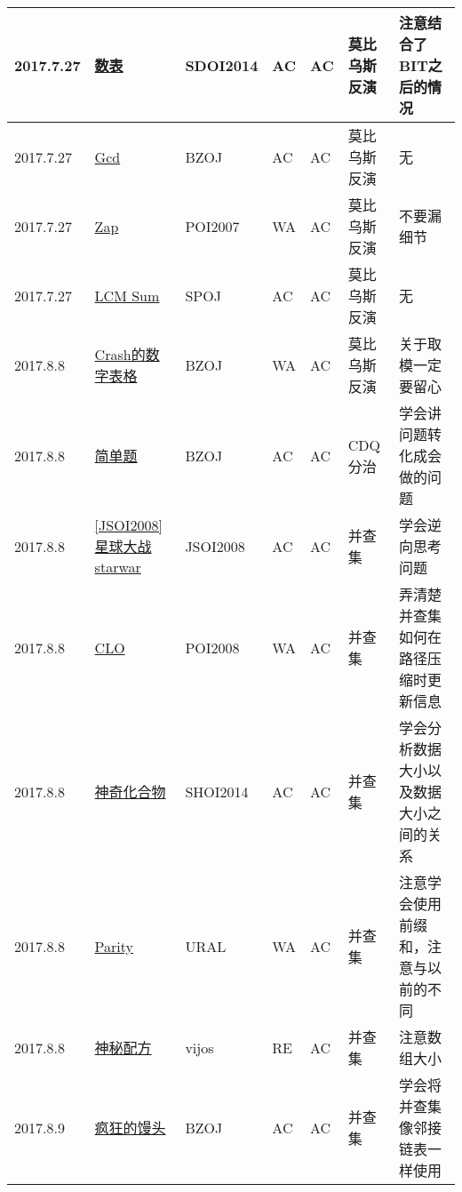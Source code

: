 \documentclass[a4paper]{article}
\begin{document}
\begin{longtable}{|p{1.5cm}|p{2.5cm}|p{1.6cm}|p{1.6cm}|p{1cm}|p{3cm}|p{4cm}|}
		\hline
		2017.7.27 & \href {http://www.lydsy.com/JudgeOnline/problem.php?id=3529}{数表}
		 & SDOI2014 & AC & AC & 莫比乌斯反演 & 注意结合了BIT之后的情况\\
		
		\hline
		2017.7.27 & \href {http://www.lydsy.com/JudgeOnline/problem.php?id=2818}{Gcd}
		 & BZOJ & AC & AC & 莫比乌斯反演 & 无\\
		
		\hline
		2017.7.27 & \href {http://www.lydsy.com/JudgeOnline/problem.php?id=1101}{Zap}
		 & POI2007 & WA & AC & 莫比乌斯反演 & 不要漏细节\\
		
		\hline
		2017.7.27 & \href {https://vjudge.net/problem/SPOJ-LCMSUM}{LCM Sum}
		 & SPOJ & AC & AC & 莫比乌斯反演 & 无\\
		
		\hline
		2017.8.8 & \href {http://www.lydsy.com/JudgeOnline/problem.php?id=2154}{Crash的数字表格}
		 & BZOJ & WA & AC & 莫比乌斯反演 & 关于取模一定要留心\\
		
		\hline
		2017.8.8 & \href {http://www.lydsy.com/JudgeOnline/problem.php?id=2683}{简单题}
		 & BZOJ & AC & AC & CDQ分治 & 学会讲问题转化成会做的问题\\
		
		\hline
		2017.8.8 & \href {http://www.lydsy.com/JudgeOnline/problem.php?id=1015}{[JSOI2008]星球大战starwar}
		 & JSOI2008 & AC & AC & 并查集 & 学会逆向思考问题\\
		
		\hline
		2017.8.8 & \href {http://www.lydsy.com/JudgeOnline/problem.php?id=1116}{CLO}
		 & POI2008 & WA & AC & 并查集 & 弄清楚并查集如何在路径压缩时更新信息\\
		
		\hline
		2017.8.8 & \href {http://www.lydsy.com/JudgeOnline/problem.php?id=3562}{神奇化合物}
		 & SHOI2014 & AC & AC & 并查集 & 学会分析数据大小以及数据大小之间的关系\\
		
		\hline
		2017.8.8 & \href {https://vjudge.net/problem/URAL-1003}{Parity}
		 & URAL & WA & AC & 并查集 & 注意学会使用前缀和，注意与以前的不同\\
		
		\hline
		2017.8.8 & \href {https://vijos.org/p/1221}{神秘配方}
		 & vijos & RE & AC & 并查集 & 注意数组大小\\
		
		\hline
		2017.8.9 & \href {http://www.lydsy.com/JudgeOnline/problem.php?id=2054}{疯狂的馒头}
		 & BZOJ & AC & AC & 并查集 & 学会将并查集像邻接链表一样使用\\
		

\end{longtable}
\end{document}
